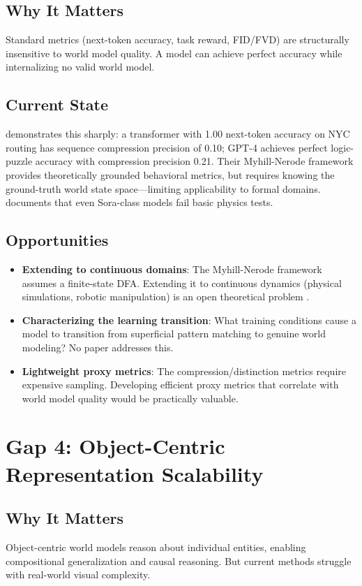 \documentclass[11pt,a4paper]{article}
\begin{document}
\subsection{Why It Matters}
Standard metrics (next-token accuracy, task reward, FID/FVD) are structurally insensitive to world model quality. A model can achieve perfect accuracy while internalizing no valid world model.

\subsection{Current State}
\citet{vafa2024evaluating} demonstrates this sharply: a transformer with 1.00 next-token accuracy on NYC routing has sequence compression precision of 0.10; GPT-4 achieves perfect logic-puzzle accuracy with compression precision 0.21. Their Myhill-Nerode framework provides theoretically grounded behavioral metrics, but requires knowing the ground-truth world state space---limiting applicability to formal domains. \citet{ding2024understanding} documents that even Sora-class models fail basic physics tests.

\subsection{Opportunities}
\begin{itemize}[noitemsep]
    \item \textbf{Extending to continuous domains}: The Myhill-Nerode framework assumes a finite-state DFA. Extending it to continuous dynamics (physical simulations, robotic manipulation) is an open theoretical problem \citep{vafa2024evaluating}.
    \item \textbf{Characterizing the learning transition}: What training conditions cause a model to transition from superficial pattern matching to genuine world modeling? No paper addresses this.
    \item \textbf{Lightweight proxy metrics}: The compression/distinction metrics require expensive sampling. Developing efficient proxy metrics that correlate with world model quality would be practically valuable.
\end{itemize}

\section{Gap 4: Object-Centric Representation Scalability}

\subsection{Why It Matters}
Object-centric world models reason about individual entities, enabling compositional generalization and causal reasoning. But current methods struggle with real-world visual complexity.
\end{document}
